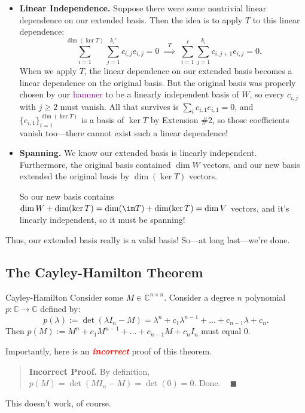 \begin{itemize}
    \item \textbf{Linear Independence.} Suppose there were some nontrivial linear dependence on our extended basis.  Then the idea is to apply $T$ to this linear dependence:
    \[ \sum_{i = 1}^{\dim (\ker T)} \sum_{j = 1}^{k_i'} c_{i, j} e_{i, j} = 0 ~ \stackrel{T}{\implies} ~ \sum_{i = 1}^{\ell} \sum_{j = 1}^{k_i} c_{i, j + 1} e_{i, j} = 0. \]
    When we apply $T$, the linear dependence on our extended basis becomes a linear dependence on the original basis.  But the original basis was properly chosen by our \textcolor{purple}{hammer} to be a linearly independent basis of $W$, so every $c_{i, j}$ with $j \geq 2$ must vanish.  All that survives is $\sum_i c_{i, 1}e_{i, 1} = 0$, and $\{e_{i, 1}\}_{i = 1}^{\dim (\ker T)}$ is a basis of $\ker T$ by Extension \#2, so those coefficients vanish too---there cannot exist such a linear dependence!
    \item \textbf{Spanning.} We know our extended basis is linearly independent.  Furthermore, the original basis contained $\dim W$ vectors, and our new basis extended the original basis by $\dim ( \ker T)$ vectors.

    So our new basis contains $\dim W + \dim ( \ker T) = \dim ( \im T) + \dim (\ker T) = \dim V$ vectors, and it's linearly independent, so it must be spanning!
\end{itemize}
Thus, our extended basis really is a valid basis!  So---at long last---we're done.

\subsection{The Cayley-Hamilton Theorem}

\begin{theorem}{Cayley-Hamilton}
    Consider some $M \in \mathbb{C}^{n \times n}$.  Consider a degree $n$ polynomial $p: \mathbb{C} \to \mathbb{C}$ defined by:
    \[ p(\lambda) := \det(\lambda I_n - M) = \lambda^n + c_1 \lambda^{n - 1} + \dots + c_{n - 1} \lambda + c_n. \]
    Then $p(M) := M^n + c_1 M^{n - 1} + \dots + c_{n - 1} M + c_n I_n$ must equal $0$.
\end{theorem}

Importantly, here is an \textbf{\emph{\textcolor{red}{incorrect}}} proof of this theorem.
\begin{quote}
    \textbf{Incorrect Proof.} By definition, $p(M) = \det (M I_n - M) = \det (0) = 0$.  Done. ~ $\blacksquare$
\end{quote}
This doesn't work, of course.

